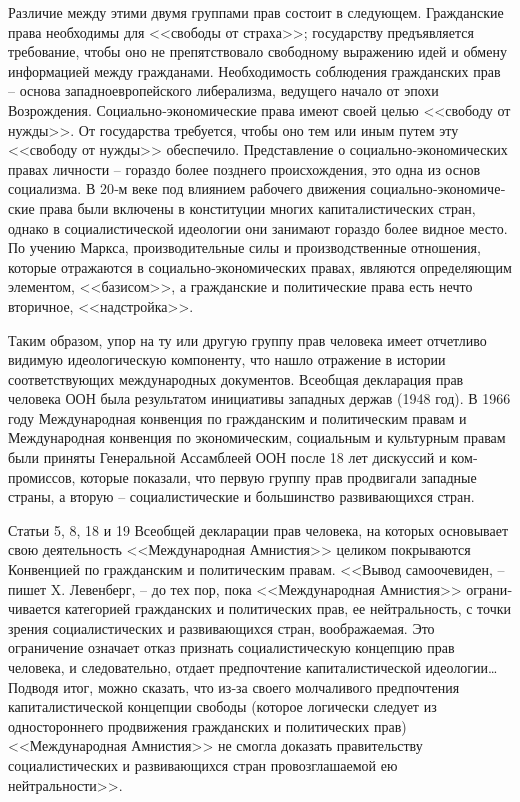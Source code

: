 \documentclass{book}
\begin{document}
{Различие между этими двумя группами прав состоит в сле­дующем. Гражданские права необходимы для <<свободы от страха>>; государству предъявляется требование, чтобы оно не препятствовало свободному выражению идей и обмену информацией между гражданами. Необходимость соблюде­ния гражданских прав -- основа западноевропейского либера­лизма, ведущего начало от эпохи Возрождения. Социально‑экономические права имеют своей целью <<свободу от нуж­ды>>. От государства требуется, чтобы оно тем или иным пу­тем эту  <<свободу от нужды>> обеспечило. Представление о социально‑экономических правах личности -- гораздо более позднего происхождения, это одна из основ социализма. В 20‑м веке под влиянием рабочего движения социально‑экономиче­ские права были включены в конституции многих капиталисти­ческих стран, однако в социалистической идеологии они зани­мают гораздо более видное место. По учению Маркса, произ­водительные силы и производственные отношения, которые отражаются в социально‑экономических правах, являются определяющим элементом, <<базисом>>, а гражданские и поли­тические права есть нечто вторичное, <<надстройка>>.

Таким образом, упор на ту или другую группу прав чело­века имеет отчетливо видимую идеологическую компоненту, что нашло отражение в истории соответствующих международ­ных документов. Всеобщая декларация прав человека ООН была результатом инициативы западных держав (1948 год). В 1966 году Международная конвенция по гражданским и по­литическим правам и Международная конвенция по экономи­ческим, социальным и культурным правам были приняты Ге­неральной Ассамблеей ООН после 18 лет дискуссий и ком­промиссов, которые показали, что первую группу прав про­двигали западные страны, а вторую -- социалистические и боль­шинство развивающихся стран.

Статьи 5, 8, 18 и 19 Всеобщей декларации прав человека, на которых основывает свою деятельность <<Международная Ам­нистия>> целиком покрываются Конвенцией по гражданским и политическим правам. <<Вывод самоочевиден, -- пишет X. Левенберг, -- до тех пор, пока <<Международная Амнистия>> ограни­чивается категорией гражданских и политических прав, ее нейтральность, с точки зрения социалистических и развива­ющихся стран, воображаемая. Это ограничение означает от­каз признать социалистическую концепцию прав человека, и следовательно, отдает предпочтение капиталистической идео­логии\ldots Подводя итог, можно сказать, что из‑за своего молча­ливого предпочтения капиталистической концепции свободы (которое логически следует из одностороннего продвижения гражданских и политических прав) <<Международная Амнистия>> не смогла доказать правительству социалистических и развива­ющихся стран провозглашаемой ею нейтральности>>.

}
\end{document}
